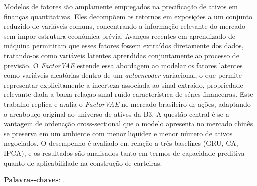 \begin{resumo}
Modelos de fatores são amplamente empregados na precificação de ativos em finanças quantitativas. Eles decompõem os retornos em exposições a um conjunto reduzido de variáveis comuns, concentrando a informação relevante do mercado sem impor estrutura econômica prévia. Avanços recentes em aprendizado de máquina permitiram que esses fatores fossem extraídos diretamente dos dados, tratando-os como variáveis latentes aprendidas conjuntamente ao processo de previsão. O \textit{FactorVAE} estende essa abordagem ao modelar os fatores latentes como variáveis aleatórias dentro de um \textit{autoencoder} variacional, o que permite representar explicitamente a incerteza associada ao sinal extraído, propriedade relevante dada a baixa relação sinal-ruído característica de séries financeiras. Este trabalho replica e avalia o \textit{FactorVAE} no mercado brasileiro de ações, adaptando o arcabouço original ao universo de ativos da B3. A questão central é se a vantagem de ordenação cross-sectional que o modelo apresenta no mercado chinês se preserva em um ambiente com menor liquidez e menor número de ativos negociados. O desempenho é avaliado em relação a três baselines (GRU, CA, IPCA), e os resultados são analisados tanto em termos de capacidade preditiva quanto de aplicabilidade na construção de carteiras.

\textbf{Palavras-chaves}: \imprimirpalavraschavesresumo.
\end{resumo}